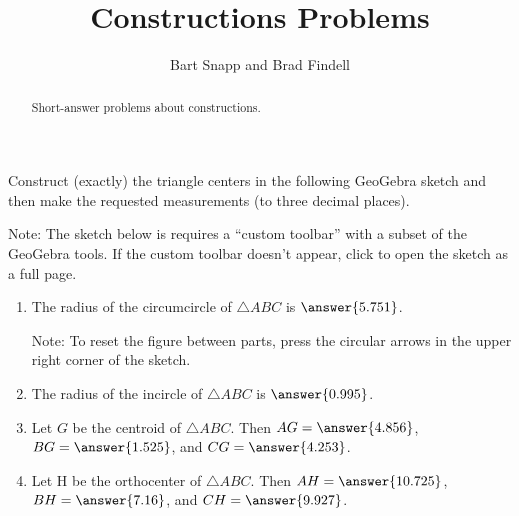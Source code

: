 \documentclass[nooutcomes]{ximera}
\title{Constructions Problems}
\author{Bart Snapp and Brad Findell}
\begin{document}
\begin{abstract}
Short-answer problems about constructions. 
\end{abstract}
\maketitle


\begin{problem}
Construct (exactly) the triangle centers in the following 
GeoGebra sketch and then make the requested measurements (to three decimal places).  

Note: The sketch below is requires a ``custom toolbar'' with a subset of the GeoGebra tools.  If the custom toolbar doesn't appear, click 
 to open the sketch as a full page.  


\begin{center}  
\end{center}
\begin{enumerate}
\item The radius of the circumcircle of $\triangle ABC$ is 
$\answer{5.751}$.  

Note: To reset the figure between parts, press the circular arrows in the upper right corner of the sketch.   

\item The radius of the incircle of $\triangle ABC$ is 
$\answer{0.995}$.  

\item Let $G$ be the centroid of $\triangle ABC$.  
Then $AG = \answer{4.856}$, $BG = \answer{1.525}$, 
and $CG = \answer{4.253}$.  

\item Let H be the orthocenter of $\triangle ABC$. 
Then $AH = \answer{10.725}$, $BH = \answer{7.16}$, 
and $CH = \answer{9.927}$. 
\end{enumerate}

\end{problem}
\end{document}
